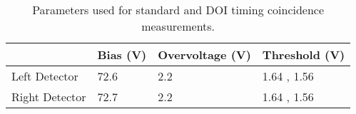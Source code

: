 \begin{table}
\caption{\label{tab:optimumparam} Parameters used for standard and DOI timing coincidence measurements.} 
\begin{tabular}{llll}
\hline
{} & Bias (V) & Overvoltage (V) & Threshold (V) \\
\hline
Left Detector  &     72.6 &             2.2 &   1.64 , 1.56 \\
Right Detector &     72.7 &             2.2 &   1.64 , 1.56 \\
\hline
\end{tabular}
\end{table}
